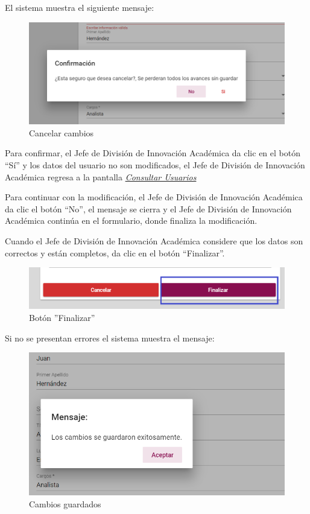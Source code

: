 El sistema muestra el siguiente mensaje:
\clearpage
\begin{figure}[H]
	\centering
	\includegraphics[width=0.4\linewidth]{images/SP5/MSG29}
	\caption{Cancelar cambios}
	\label{mensaje29}
	
\end{figure}

Para confirmar, el Jefe de División de Innovación Académica  da clic en el botón “Sí” y los datos del usuario no son modificados, el Jefe de División de Innovación Académica  regresa a la pantalla \hyperlink{consultarUs}{\textit{Consultar Usuarios}}

Para continuar con la modificación, el Jefe de División de Innovación Académica   da clic el botón “No”, el mensaje se cierra y el Jefe de División de Innovación Académica  continúa en el formulario, donde finaliza la modificación.

Cuando el Jefe de División de Innovación Académica  considere que los datos son correctos y están completos, da clic en el botón “Finalizar”.
\begin{figure}[H]
	\centering
	\hypertarget{btnfin}{\includegraphics[width=0.7\linewidth]{images/SP5/BtnFinalizar}}
	\caption{Botón ''Finalizar''}
	\label{btnfin}
\end{figure}

Si no se presentan errores el sistema muestra el mensaje:

\begin{figure}[H]
	\centering
	\includegraphics[width=0.4\linewidth]{images/SP5/MSG31}
	\caption{Cambios guardados}
	\label{mensaje31}
	
\end{figure}

